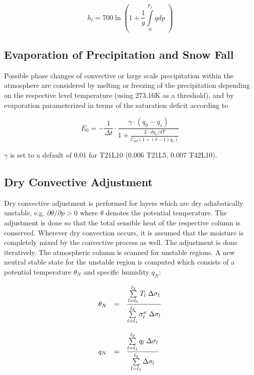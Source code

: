 \begin{equation}
h_l= 700 \ln{\left(1 + \frac{1}{g} \int\limits^{p_s}_0 q dp \; \right)}
\end{equation}

\subsection{Evaporation of Precipitation and Snow
Fall}
Possible phase changes of convective or large scale
precipitation within the atmosphere are considered by melting or freezing of the precipitation depending on the respective level temperature (using 273.16K as a threshold), and by evaporation parameterized in terms of the saturation deficit according to

\begin{equation}
E_0=-\frac{1}{\Delta t}\cdot \frac{\gamma\cdot(q_0-q_s)}{1+\frac{L\cdot dq_s/dT}{C_{pd}(1+(\delta-1)q_v)}}
\end{equation}

$\gamma$ is set to a default of 0.01 for T21L10 (0.006 T21L5, 0.007 T42L10).


\subsection{Dry Convective Adjustment}

Dry convective adjustment is performed for layers which are dry adiabatically unstable, e.g.
$\partial \theta / \partial p > 0$ where $\theta$ denotes the potential temperature. The adjustment
is done so that the total sensible heat of the respective column is conserved. Wherever dry
convection occurs, it is assumed that the moisture is completely mixed by the convective
process as well. The adjustment is done iteratively. The atmospheric column is scanned for
unstable regions. A new neutral stable state for the unstable region is computed which consists
of a potential temperature $\theta_N$ and specific humidity $q_N$:

\begin{equation}
\begin{array}{lcl}

\displaystyle \theta_N & = & \displaystyle \frac{\sum\limits_{l=l_1}^{l_2} T_l \; \Delta\sigma_l}
{\sum\limits_{l=l_1}^{l_2} \sigma_l^{\kappa} \; \Delta\sigma_l} \\
&&\\
\displaystyle q_N & = & \displaystyle \frac{\sum\limits_{l=l_1}^{l_2} q_l \; \Delta\sigma_l}
{\sum\limits_{l=l_1}^{l_2} \Delta\sigma_l} \\
\end{array}
\end{equation}

